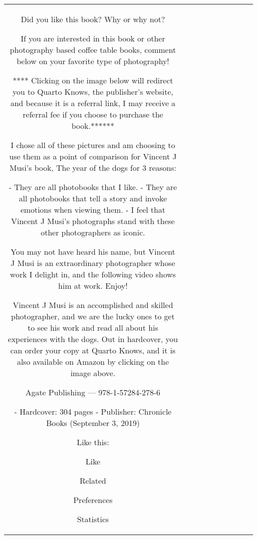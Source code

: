 \begin{table}[h!]
\begin{tabular}{|c|c|c|c|c|c|c|c|c|c|}
Did you like this book? Why or why not?

If you are interested in this book or other photography based coffee table books, comment below on your favorite type of photography!

**** Clicking on the image below will redirect you to Quarto Knows, the publisher’s website, and because it is a referral link, I may receive a referral fee if you choose to purchase the book.******



I chose all of these pictures and am choosing to use them as a point of comparison for Vincent J Musi’s book, The year of the dogs for 3 reasons:

- They are all photobooks that I like.
- They are all photobooks that tell a story and invoke emotions when viewing them.
- I feel that Vincent J Musi’s photographs stand with these other photographers as iconic.

You may not have heard his name, but Vincent J Musi is an extraordinary photographer whose work I delight in, and the following video shows him at work. Enjoy!

Vincent J Musi is an accomplished and skilled photographer, and we are the lucky ones to get to see his work and read all about his experiences with the dogs. Out in hardcover, you can order your copy at Quarto Knows, and it is also available on Amazon by clicking on the image above.

Agate Publishing —   978-1-57284-278-6

- Hardcover: 304 pages
- Publisher: Chronicle Books (September 3, 2019)

Like this:

Like 

Related

Preferences 

Statistics 


\end{tabular}
\end{table}

